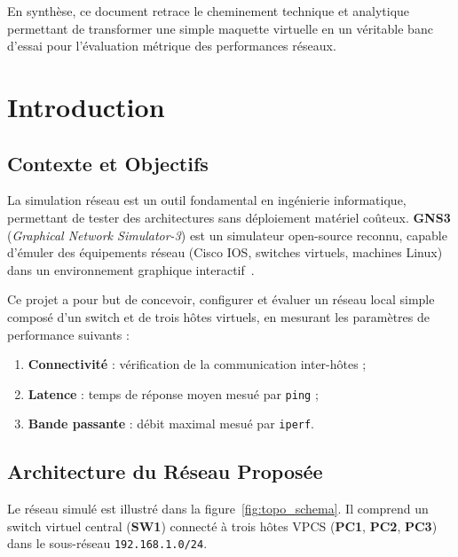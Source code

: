 \documentclass[11pt,a4paper,oneside]{report}
\begin{document}
\vspace{10pt}
En synth\`{e}se, ce document retrace le cheminement technique et analytique permettant de transformer une simple maquette virtuelle en un v\'{e}ritable banc d'essai pour l'\'{e}valuation m\'{e}trique des performances r\'{e}seaux.

\chapter{Introduction}

\section{Contexte et Objectifs}

La simulation r\'{e}seau est un outil fondamental en ing\'{e}nierie informatique,
permettant de tester des architectures sans d\'{e}ploiement mat\'{e}riel co\^{u}teux.
\textbf{GNS3} (\textit{Graphical Network Simulator-3}) est un simulateur open-source
reconnu, capable d'\'{e}muler des \'{e}quipements r\'{e}seau (Cisco IOS, switches virtuels,
machines Linux) dans un environnement graphique interactif~\cite{gns32026}.


Ce projet a pour but de concevoir, configurer et \'{e}valuer un r\'{e}seau local simple
compos\'{e} d'un switch et de trois h\^{o}tes virtuels, en mesurant les param\`{e}tres
de performance suivants :

\begin{enumerate}[label=\textbf{\arabic*.}, leftmargin=*, itemsep=2pt]
  \item \textbf{Connectivit\'{e}} : v\'{e}rification de la communication inter-h\^{o}tes ;
  \item \textbf{Latence} : temps de r\'{e}ponse moyen mesu\'{e} par \texttt{ping} ;
  \item \textbf{Bande passante} : d\'{e}bit maximal mesu\'{e} par \texttt{iperf}.
\end{enumerate}

\section{Architecture du R\'{e}seau Propos\'{e}e}

Le r\'{e}seau simul\'{e} est illustr\'{e} dans la figure~\ref{fig:topo_schema}.
Il comprend un switch virtuel central (\textbf{SW1}) connect\'{e} \`{a} trois h\^{o}tes
VPCS (\textbf{PC1}, \textbf{PC2}, \textbf{PC3}) dans le sous-r\'{e}seau
\texttt{192.168.1.0/24}.
\end{document}
